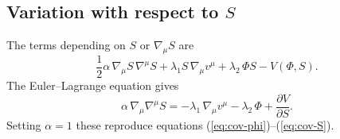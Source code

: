 \documentclass[12pt,a4paper]{article}
\theoremstyle{plain}
\theoremstyle{definition}
\theoremstyle{remark}
\begin{document}
\subsection*{Variation with respect to $S$}

The terms depending on $S$ or $\nabla_\mu S$ are
\begin{equation}
\frac{1}{2}\alpha\,\nabla_\mu S\,\nabla^\mu S
+ \lambda_1 S\,\nabla_\mu v^\mu + \lambda_2\,\Phi S - V(\Phi,S).
\end{equation}
The Euler--Lagrange equation gives
\begin{equation}
\alpha\,\nabla_\mu\nabla^\mu S =
-\lambda_1\,\nabla_\mu v^\mu - \lambda_2\,\Phi
+ \frac{\partial V}{\partial S}.
\end{equation}
Setting $\alpha = 1$ these reproduce equations
(\ref{eq:cov-phi})--(\ref{eq:cov-S}).
\end{document}
